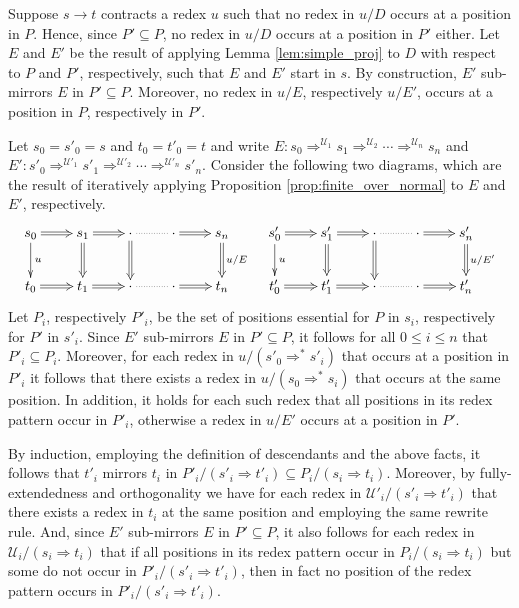 \documentclass{LMCS}
\theoremstyle{definition}
\newcommand{\rew}{\rightarrow}
\newcommand{\dev}{\Rightarrow}
\newcommand{\fscd}[3]{{#1}_0 \dev^{\mathcal{#2}_1} {#1}_1 \dev^{\mathcal{#2}_2} \cdots \dev^{\mathcal{#2}_{#3}} {#1}_{#3}}
\newcommand{\fscdp}[3]{{#1}'_0 \dev^{\mathcal{#2}'_1} {#1}'_1 \dev^{\mathcal{#2}'_2} \cdots \dev^{\mathcal{#2}'_{#3}} {#1}'_{#3}}
\begin{document}
\proof
Suppose $s \rew t$ contracts a redex $u$ such that no redex in $u / D$ occurs at a position in $P$. Hence, since $P' \subseteq P$, no redex in $u / D$ occurs at a position in $P'$ either. Let $E$ and $E'$ be the result of applying Lemma \ref{lem:simple_proj} to $D$ with respect to $P$ and $P'$, respectively, such that $E$ and $E'$ start in $s$. By construction, $E'$ sub-mirrors $E$ in $P' \subseteq P$. Moreover, no redex in $u /E$, respectively $u / E'$, occurs at a position in $P$, respectively in $P'$.

Let $s_0 = s'_0 = s$ and $t_0 = t'_0 = t$ and write $E : \fscd{s}{U}{n}$ and $E' : \fscdp{s}{U}{n}$. Consider the following two diagrams, which are the result of iteratively applying Proposition \ref{prop:finite_over_normal} to $E$ and $E'$, respectively.
\[
\xymatrix@=0.78cm{
s_0 \ar@{=>}[r] \ar[d]^{u}
  & s_1 \ar@{=>}[r] \ar@{=>}[d]
  & \cdot \ar@{.}[r] \ar@{=>}[d]
  & \cdot \ar@{=>}[r]
  & s_n \ar@{=>}[d]^{u / E}
&
s'_0 \ar@{=>}[r] \ar[d]^{u}
  & s'_1 \ar@{=>}[r] \ar@{=>}[d]
  & \cdot \ar@{.}[r] \ar@{=>}[d]
  & \cdot \ar@{=>}[r]
  & s'_n \ar@{=>}[d]^{u / E'}
 \\
t_0 \ar@{=>}[r]
  & t_1 \ar@{=>}[r]
  & \cdot \ar@{.}[r]
  & \cdot \ar@{=>}[r]
  & t_n
&
t'_0 \ar@{=>}[r]
  & t'_1 \ar@{=>}[r]
  & \cdot \ar@{.}[r]
  & \cdot \ar@{=>}[r]
  & t'_n
}
\]
Let $P_i$, respectively $P'_i$, be the set of positions essential for $P$ in $s_i$, respectively for $P'$ in $s'_i$. Since $E'$ sub-mirrors $E$ in $P' \subseteq P$, it follows for all $0 \leq i \leq n$ that $P'_i \subseteq P_i$. Moreover, for each redex in $u / (s'_0 \dev^* s'_i)$ that occurs at a position in $P'_i$ it follows that there exists a redex in $u / (s_0 \dev^* s_i)$ that occurs at the same position. In addition, it holds for each such redex that all positions in its redex pattern occur in $P'_i$, otherwise a redex in $u / E'$ occurs at a position in $P'$.

By induction, employing the definition of descendants and the above facts, it follows that $t'_i$ mirrors $t_i$ in $P'_i / (s'_i \dev t'_i) \subseteq P_i / (s_i \dev t_i)$. Moreover, by fully-extendedness and orthogonality we have for each redex in $\mathcal{U}'_i / (s'_i \dev t'_i)$ that there exists a redex in $t_i$ at the same position and employing the same rewrite rule. And, since $E'$ sub-mirrors $E$ in $P' \subseteq P$, it also follows for each redex in $\mathcal{U}_i / (s_i \dev t_i)$ that if all positions in its redex pattern occur in $P_i / (s_i \dev t_i)$ but some do not occur in $P'_i / (s'_i \dev t'_i)$, then in fact no position of the redex pattern occurs in  $P'_i / (s'_i \dev t'_i)$.
\end{document}
